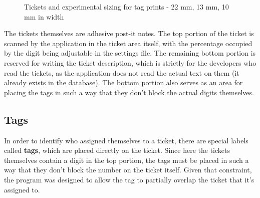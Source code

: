 \documentclass[12pt]{report}
\theoremstyle{definition}
\theoremstyle{remark}
\begin{document}
\begin{figure}[h]
    \centering
    \qquad
    \caption{Tickets and experimental sizing for tag prints - 22 mm, 13 mm, 10 mm in width}
    \label{fig:tags_scale}
\end{figure}

The tickets themselves are adhesive post-it notes. The top portion of the ticket is scanned by the application in the ticket area itself, with the percentage occupied by the digit being adjustable in the settings file. The remaining bottom portion is reserved for writing the ticket description, which is strictly for the developers who read the tickets, as the application does not read the actual text on them (it already exists in the database). The bottom portion also serves as an area for placing the tags in such a way that they don't block the actual digits themselves.


\subsection{Tags}
In order to identify who assigned themselves to a ticket, there are special labels called \textbf{tags}, which are placed directly on the ticket. Since here the tickets themselves contain a digit in the top portion, the tags must be placed in such a way that they don't block the number on the ticket itself. Given that constraint, the program was designed to allow the tag to partially overlap the ticket that it's assigned to.
\end{document}
